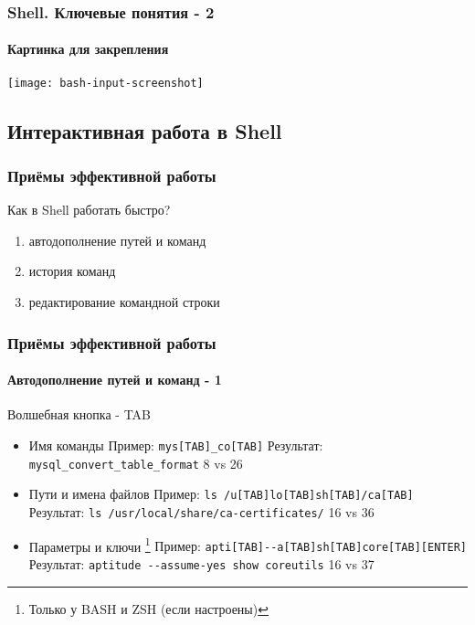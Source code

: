 \begin{frame}
  \frametitle{Shell. Ключевые понятия - 2}
  \framesubtitle{Картинка для закрепления}
    \hbox{\texttt{[image: bash-input-screenshot]}}
\end{frame}

\subsection{Интерактивная работа в Shell}

\begin{frame}
  \frametitle{Приёмы эффективной работы}

  \alert{\Large{Как в Shell работать быстро?}} 
  \pause

  \begin{enumerate}
    \item \Large{автодополнение путей и команд}
    \item \Large{история команд}
    \item \Large{редактирование командной строки}
  \end{enumerate}

\end{frame}

\begin{frame}[fragile]
  \frametitle{Приёмы эффективной работы}
  \framesubtitle{Автодополнение путей и команд - 1}

  \alert{\Large{Волшебная кнопка - TAB}} \newline
  \pause
  \begin{itemize}
    \item \Large{Имя команды} \pause \newline
      \small{Пример: \verb+mys[TAB]_co[TAB]+} \pause \newline
      \small{Результат: \verb+mysql_convert_table_format+} \newline
      \alert{8 vs 26} \pause
    \item \Large{Пути и имена файлов} \pause \newline
      \small{Пример: \verb+ls /u[TAB]lo[TAB]sh[TAB]/ca[TAB]+} \pause \newline
      \small{Результат: \verb+ls /usr/local/share/ca-certificates/+} \newline
      \alert{16 vs 36} \pause
    \item \Large{Параметры и ключи} \footnote{Только у BASH и ZSH (если настроены)} \pause \newline
      \small{Пример: \verb+apti[TAB]--a[TAB]sh[TAB]core[TAB][ENTER]+} \pause \newline
      \small{Результат: \verb+aptitude --assume-yes show coreutils+} \newline
      \alert{16 vs 37} \pause
  \end{itemize}
\end{frame}

